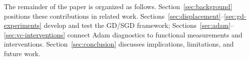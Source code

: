 The remainder of the paper is organized as follows. Section~\ref{sec:background} positions these contributions in related work. Sections~\ref{sec:displacement}--\ref{sec:gd-experiments} develop and test the GD/SGD framework; Sections~\ref{sec:adam}--\ref{sec:vc-interventions} connect Adam diagnostics to functional measurements and interventions. Section~\ref{sec:conclusion} discusses implications, limitations, and future work.
